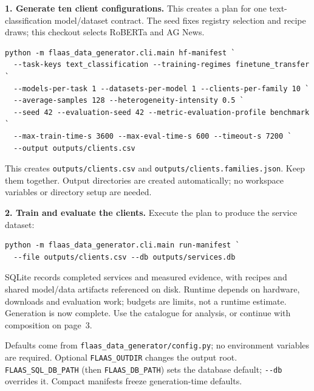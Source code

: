 \documentclass[10pt,a4paper]{article}
\newcommand{\code}[1]{\nolinkurl{#1}}
\newcommand{\lead}[1]{\par\smallskip\noindent\textbf{#1}\enspace}
\begin{document}
\lead{1. Generate ten client configurations.} This creates a plan for one text-classification model/dataset contract. The seed fixes registry selection and recipe draws; this checkout selects RoBERTa and AG News.
\begin{lstlisting}
python -m flaas_data_generator.cli.main hf-manifest `
  --task-keys text_classification --training-regimes finetune_transfer `
  --models-per-task 1 --datasets-per-model 1 --clients-per-family 10 `
  --average-samples 128 --heterogeneity-intensity 0.5 `
  --seed 42 --evaluation-seed 42 --metric-evaluation-profile benchmark `
  --max-train-time-s 3600 --max-eval-time-s 600 --timeout-s 7200 `
  --output outputs/clients.csv
\end{lstlisting}
This creates \code{outputs/clients.csv} and \code{outputs/clients.families.json}. Keep them together. Output directories are created automatically; no workspace variables or directory setup are needed.

\lead{2. Train and evaluate the clients.} Execute the plan to produce the service dataset:
\begin{lstlisting}
python -m flaas_data_generator.cli.main run-manifest `
  --file outputs/clients.csv --db outputs/services.db
\end{lstlisting}
SQLite records completed services and measured evidence, with recipes and shared model/data artifacts referenced on disk. Runtime depends on hardware, downloads and evaluation work; budgets are limits, not a runtime estimate. Generation is now complete. Use the catalogue for analysis, or continue with composition on page~3.

Defaults come from \code{flaas_data_generator/config.py}; no environment variables are required. Optional \code{FLAAS_OUTDIR} changes the output root. \code{FLAAS_SQL_DB_PATH} (then \code{FLAAS_DB_PATH}) sets the database default; \code{--db} overrides it. Compact manifests freeze generation-time defaults.
\end{document}
